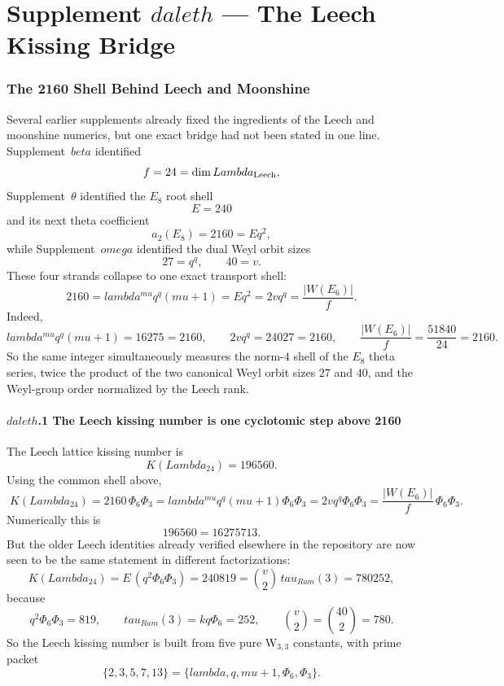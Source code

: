 \documentclass[12pt,a4paper]{article}
\def\mathrm#1{#1}%
\def\omega{omega}%
\def\beta{beta}%
\def\lambda{lambda}%
\def\Lambda{Lambda}%
\def\mu{mu}%
\def\Phi#1{Phi#1}%
\def\tau{tau}%
\def\daleth{daleth}%
\def\cdot{ }%
\theoremstyle{definition}
\begin{document}
\part*{\texorpdfstring{Supplement $\daleth$ --- The Leech Kissing Bridge}{Supplement daleth --- The Leech Kissing Bridge}}

\section*{The 2160 Shell Behind Leech and Moonshine}

Several earlier supplements already fixed the ingredients of the Leech and
moonshine numerics, but one exact bridge had not been stated in one line.
Supplement~$\beta$ identified
\[
f = 24 = \dim \Lambda_{\rm Leech},
\]
Supplement~$\theta$ identified the $E_8$ root shell
\[
E = 240
\]
and its next theta coefficient
\[
a_2(E_8) = 2160 = E q^2,
\]
while Supplement~$\omega$ identified the dual Weyl orbit sizes
\[
27 = q^q,
\qquad
40 = v.
\]
These four strands collapse to one exact transport shell:
\[
\boxed{\;
2160
= \lambda^{\mu} q^q (\mu+1)
= E q^2
= 2vq^q
= \frac{|W(E_6)|}{f}.
\;}
\]
Indeed,
\[
\lambda^{\mu} q^q (\mu+1) = 16\cdot 27\cdot 5 = 2160,
\qquad
2vq^q = 2\cdot 40\cdot 27 = 2160,
\qquad
\frac{|W(E_6)|}{f} = \frac{51840}{24} = 2160.
\]
So the same integer simultaneously measures the norm-$4$ shell of the $E_8$
theta series, twice the product of the two canonical Weyl orbit sizes $27$ and
$40$, and the Weyl-group order normalized by the Leech rank.

\subsection*{$\daleth$.1 \quad The Leech kissing number is one cyclotomic step above 2160}

The Leech lattice kissing number is
\[
K(\Lambda_{24}) = 196560.
\]
Using the common shell above,
\[
\boxed{\;
K(\Lambda_{24})
= 2160\,\Phi_6\Phi_3
= \lambda^{\mu} q^q (\mu+1)\Phi_6\Phi_3
= 2vq^q\Phi_6\Phi_3
= \frac{|W(E_6)|}{f}\,\Phi_6\Phi_3.
\;}
\]
Numerically this is
\[
196560 = 16\cdot 27\cdot 5\cdot 7\cdot 13.
\]
But the older Leech identities already verified elsewhere in the repository are
now seen to be the same statement in different factorizations:
\[
K(\Lambda_{24}) = E\,(q^2\Phi_6\Phi_3) = 240\cdot 819
= \binom{v}{2}\,\tau_{\mathrm{Ram}}(3) = 780\cdot 252,
\]
because
\[
q^2\Phi_6\Phi_3 = 819,
\qquad
\tau_{\mathrm{Ram}}(3) = kq\Phi_6 = 252,
\qquad
\binom{v}{2} = \binom{40}{2} = 780.
\]
So the Leech kissing number is built from five pure W$_{3,3}$ constants,
with prime packet
\[
\{2,3,5,7,13\} = \{\lambda,q,\mu+1,\Phi_6,\Phi_3\}.
\]
\end{document}
